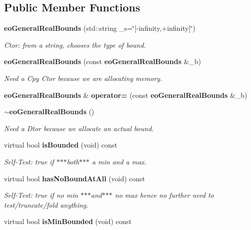 \subsection*{Public Member Functions}
\begin{CompactItemize}
\item 
{\bf eo\-General\-Real\-Bounds} (std::string \_\-s=\char`\"{}[-infinity,+infinity]\char`\"{})\label{classeo_general_real_bounds_a0}

\begin{CompactList}\small\item\em Ctor: from a string, chooses the type of bound. \item\end{CompactList}\item 
{\bf eo\-General\-Real\-Bounds} (const {\bf eo\-General\-Real\-Bounds} \&\_\-b)\label{classeo_general_real_bounds_a1}

\begin{CompactList}\small\item\em Need a Cpy Ctor because we are allocating memory. \item\end{CompactList}\item 
{\bf eo\-General\-Real\-Bounds} \& {\bf operator=} (const {\bf eo\-General\-Real\-Bounds} \&\_\-b)\label{classeo_general_real_bounds_a2}

\item 
{\bf $\sim$eo\-General\-Real\-Bounds} ()\label{classeo_general_real_bounds_a3}

\begin{CompactList}\small\item\em Need a Dtor because we allocate an actual bound. \item\end{CompactList}\item 
virtual bool {\bf is\-Bounded} (void) const \label{classeo_general_real_bounds_a4}

\begin{CompactList}\small\item\em Self-Test: true if $\ast$$\ast$$\ast$both$\ast$$\ast$$\ast$ a min and a max. \item\end{CompactList}\item 
virtual bool {\bf has\-No\-Bound\-At\-All} (void) const \label{classeo_general_real_bounds_a5}

\begin{CompactList}\small\item\em Self-Test: true if no min $\ast$$\ast$$\ast$and$\ast$$\ast$$\ast$ no max hence no further need to test/truncate/fold anything. \item\end{CompactList}\item 
virtual bool {\bf is\-Min\-Bounded} (void) const \label{classeo_general_real_bounds_a6}


\end{CompactItemize}
